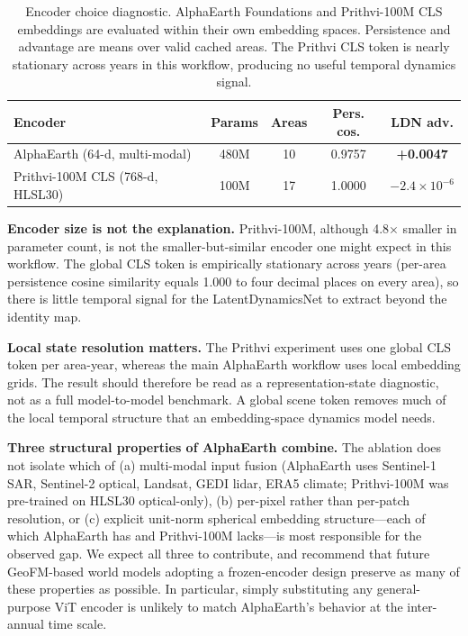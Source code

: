 \documentclass{article}
\begin{document}
\begin{table}[htbp]
\centering
\caption{Encoder choice diagnostic. AlphaEarth Foundations and Prithvi-100M CLS embeddings are evaluated within their own embedding spaces. Persistence and advantage are means over valid cached areas. The Prithvi CLS token is nearly stationary across years in this workflow, producing no useful temporal dynamics signal.}
\label{tab:encoder_ablation}
\small
\begin{tabular*}{\textwidth}{@{\extracolsep{\fill}}lcccc@{}}
\toprule
Encoder & Params & Areas & Pers. cos. & LDN adv. \\
\midrule
AlphaEarth (64-d, multi-modal) & 480M & 10 & 0.9757 & \textbf{+0.0047} \\
Prithvi-100M CLS (768-d, HLSL30) & 100M & 17 & 1.0000 & $-2.4 \times 10^{-6}$ \\
\bottomrule
\end{tabular*}
\end{table}

\textbf{Encoder size is not the explanation.} Prithvi-100M, although 4.8$\times$ smaller in parameter count, is not the smaller-but-similar encoder one might expect in this workflow. The global CLS token is empirically stationary across years (per-area persistence cosine similarity equals 1.000 to four decimal places on every area), so there is little temporal signal for the LatentDynamicsNet to extract beyond the identity map.

\textbf{Local state resolution matters.} The Prithvi experiment uses one global CLS token per area-year, whereas the main AlphaEarth workflow uses local embedding grids. The result should therefore be read as a representation-state diagnostic, not as a full model-to-model benchmark. A global scene token removes much of the local temporal structure that an embedding-space dynamics model needs.

\textbf{Three structural properties of AlphaEarth combine.} The ablation does not isolate which of (a) multi-modal input fusion (AlphaEarth uses Sentinel-1 SAR, Sentinel-2 optical, Landsat, GEDI lidar, ERA5 climate; Prithvi-100M was pre-trained on HLSL30 optical-only), (b) per-pixel rather than per-patch resolution, or (c) explicit unit-norm spherical embedding structure---each of which AlphaEarth has and Prithvi-100M lacks---is most responsible for the observed gap. We expect all three to contribute, and recommend that future GeoFM-based world models adopting a frozen-encoder design preserve as many of these properties as possible. In particular, simply substituting any general-purpose ViT encoder is unlikely to match AlphaEarth's behavior at the inter-annual time scale.
\end{document}
